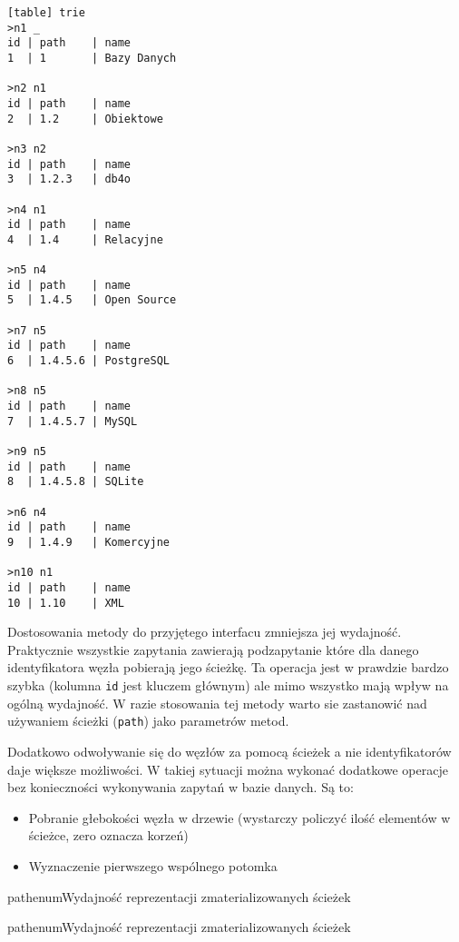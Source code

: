 \begin{verbatim}[table] trie
>n1 _
id | path    | name
1  | 1       | Bazy Danych

>n2 n1
id | path    | name
2  | 1.2     | Obiektowe

>n3 n2
id | path    | name
3  | 1.2.3   | db4o

>n4 n1
id | path    | name
4  | 1.4     | Relacyjne

>n5 n4
id | path    | name
5  | 1.4.5   | Open Source

>n7 n5
id | path    | name
6  | 1.4.5.6 | PostgreSQL

>n8 n5
id | path    | name
7  | 1.4.5.7 | MySQL

>n9 n5
id | path    | name
8  | 1.4.5.8 | SQLite

>n6 n4
id | path    | name
9  | 1.4.9   | Komercyjne

>n10 n1
id | path    | name
10 | 1.10    | XML

\end{verbatim}












Dostosowania metody do przyjętego interfacu zmniejsza jej wydajność.
Praktycznie wszystkie zapytania zawierają podzapytanie które dla danego identyfikatora węzła  pobierają jego ścieżkę.
Ta operacja jest w prawdzie bardzo szybka (kolumna \texttt{id} jest kluczem głównym) ale mimo wszystko mają wpływ na ogólną wydajność.
W razie stosowania tej metody warto sie zastanowić nad używaniem ścieżki (\texttt{path}) jako parametrów metod. 

Dodatkowo odwoływanie się do węzłów za pomocą ścieżek a nie identyfikatorów daje większe możliwości.
W takiej sytuacji można wykonać dodatkowe operacje bez konieczności wykonywania zapytań w bazie danych.
Są to:
\begin{itemize}
    \item
        Pobranie głebokości węzła w drzewie (wystarczy policzyć ilość elementów w ścieżce, zero oznacza korzeń)
    \item
        Wyznaczenie pierwszego wspólnego potomka
\end{itemize}


\begin{qxtab}{pathenum}{Wydajność reprezentacji zmaterializowanych ścieżek}
\end{qxtab}

\begin{qxfig}{pathenum}{Wydajność reprezentacji zmaterializowanych ścieżek}
\end{qxfig}


